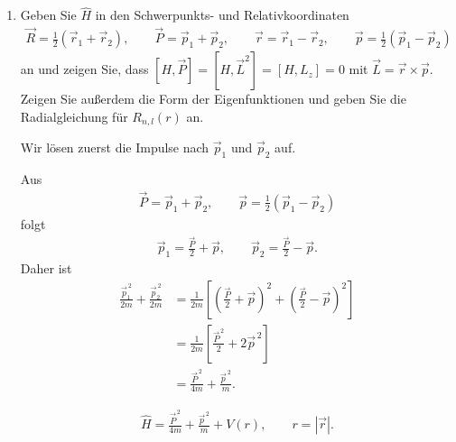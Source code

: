 \documentclass[11pt,a4paper]{scrartcl}
\newcommand{\abs}[1]{\left| #1 \right|}
\newcommand{\op}[1]{\hat{#1}}
\begin{document}
    \begin{enumerate}[label=(\alph*)]
        \item Geben Sie $\op H$ in den Schwerpunkts- und Relativkoordinaten
        \begin{align*}
            \vec R=\frac12(\vec r_1+\vec r_2),
            \qquad
            \vec P=\vec p_1+\vec p_2,
            \qquad
            \vec r=\vec r_1-\vec r_2,
            \qquad
            \vec p=\frac12(\vec p_1-\vec p_2)
        \end{align*}
        an und zeigen Sie, dass $[H,\vec P]=[H,\vec L^2]=[H,L_z]=0$ mit $\vec L=\vec r\times\vec p$. Zeigen Sie außerdem die Form der Eigenfunktionen und geben Sie die Radialgleichung für $R_{n,l}(r)$ an.

        \begin{calculationbox}
            Wir lösen zuerst die Impulse nach $\vec p_1$ und $\vec p_2$ auf.

            \begin{calculationbox}[title=Transformation der kinetischen Energie]
                Aus
                \begin{align*}
                    \vec P=\vec p_1+\vec p_2,
                    \qquad
                    \vec p=\frac12(\vec p_1-\vec p_2)
                \end{align*}
                folgt
                \begin{align*}
                    \vec p_1=\frac{\vec P}{2}+\vec p,
                    \qquad
                    \vec p_2=\frac{\vec P}{2}-\vec p.
                \end{align*}
                Daher ist
                \begin{align*}
                    \frac{\vec p_1^{\,2}}{2m}+\frac{\vec p_2^{\,2}}{2m}
                    &=
                    \frac{1}{2m}
                    \left[
                        \left(\frac{\vec P}{2}+\vec p\right)^2
                        +
                        \left(\frac{\vec P}{2}-\vec p\right)^2
                    \right]\\
                    &=
                    \frac{1}{2m}
                    \left[
                        \frac{\vec P^{\,2}}{2}+2\vec p^{\,2}
                    \right]\\
                    &=
                    \frac{\vec P^{\,2}}{4m}+\frac{\vec p^{\,2}}{m}.
                \end{align*}

                \begin{solutionbox}[title=Hamiltonoperator in Schwerpunkts- und Relativkoordinaten]
                    \begin{align*}
                        \op H
                        =
                        \frac{\vec P^{\,2}}{4m}
                        +
                        \frac{\vec p^{\,2}}{m}
                        +
                        V(r),
                        \qquad r=\abs{\vec r}.
                    \end{align*}
                \end{solutionbox}
            \end{calculationbox}


\end{calculationbox}
\end{enumerate}
\end{document}
